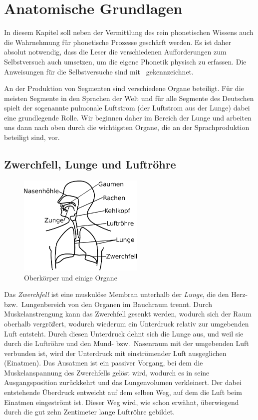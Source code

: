 \section{Anatomische Grundlagen}

\label{sec:anatomischegrundlagen}

In diesem Kapitel soll neben der Vermittlung des rein phonetischen Wissens auch die Wahrnehmung für phonetische Prozesse geschärft werden.
Es ist daher absolut notwendig, dass die Leser die verschiedenen Aufforderungen zum Selbstversuch auch umsetzen, um die eigene Phonetik physisch zu erfassen.
Die Anweisungen für die Selbstversuche sind mit \TuBegin\ gekennzeichnet.

An der Produktion von Segmenten sind verschiedene Organe beteiligt.
Für die meisten Segmente in den Sprachen der Welt und für alle Segmente des Deutschen spielt der sogenannte pulmonale Luftstrom (der Luftstrom aus der Lunge) dabei eine grundlegende Rolle.
Wir beginnen daher im Bereich der Lunge und arbeiten uns dann nach oben durch die wichtigsten Organe, die an der Sprachproduktion beteiligt sind, vor.

\subsection{Zwerchfell, Lunge und Luftröhre}

\begin{figure}
  \centering
  \includegraphics[width=6cm]{figures/ueberblick}
  \caption{Oberkörper und einige Organe}
  \label{fig:lunge}
\end{figure}

Das \textit{Zwerchfell} ist eine muskulöse Membran unterhalb der \textit{Lunge}, die den Herz- bzw.\ Lungenbereich von den Organen im Bauchraum trennt.
Durch Muskelanstrengung kann das Zwerchfell gesenkt werden, wodurch sich der Raum oberhalb vergrößert, wodurch wiederum ein Unterdruck relativ zur umgebenden Luft entsteht.
Durch diesen Unterdruck dehnt sich die Lunge aus, und weil sie durch die Luftröhre und den Mund- bzw.\ Nasenraum mit der umgebenden Luft verbunden ist, wird der Unterdruck mit einströmender Luft ausgeglichen (Einatmen).
Das Ausatmen ist ein passiver Vorgang, bei dem die Muskelanspannung des Zwerchfells gelöst wird, wodurch es in seine Ausgangsposition zurückkehrt und das Lungenvolumen verkleinert.
Der dabei entstehende Überdruck entweicht auf dem selben Weg, auf dem die Luft beim Einatmen eingeströmt ist.
Dieser Weg wird, wie schon erwähnt, überwiegend durch die gut zehn Zentimeter lange Luftröhre gebildet.

